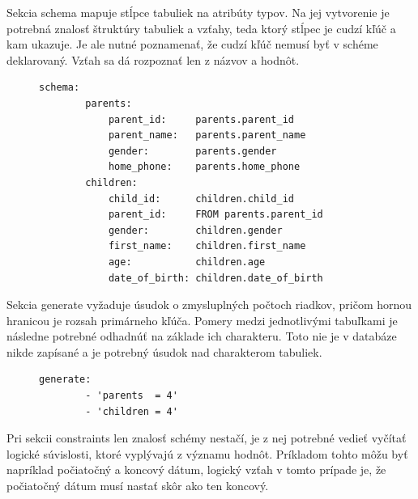 Sekcia schema mapuje stĺpce tabuliek na atribúty typov. Na jej vytvorenie je potrebná znalosť štruktúry tabuliek a vzťahy, teda ktorý stĺpec je cudzí kľúč a kam ukazuje. Je ale nutné poznamenať, že cudzí kľúč nemusí byť v schéme deklarovaný. Vzťah sa dá rozpoznať len z názvov a hodnôt. 


\begin{figure}[H]
    \centering
    \begin{lstlisting}[caption={Schema sekcia pre ukážkovú databázu.}, frame=single, linewidth=0.85\textwidth, xleftmargin=0.165\textwidth, label={lst:recipe-schema}]
    schema:
        parents:
            parent_id:     parents.parent_id
            parent_name:   parents.parent_name
            gender:        parents.gender
            home_phone:    parents.home_phone
        children:
            child_id:      children.child_id
            parent_id:     FROM parents.parent_id
            gender:        children.gender
            first_name:    children.first_name
            age:           children.age
            date_of_birth: children.date_of_birth
    \end{lstlisting}

\end{figure}

Sekcia generate vyžaduje úsudok o zmysluplných počtoch riadkov, pričom hornou hranicou je rozsah primárneho kľúča. Pomery medzi jednotlivými tabuľkami je následne potrebné odhadnúť na základe ich charakteru. Toto nie je v databáze nikde zapísané a je potrebný úsudok nad charakterom tabuliek.



\begin{figure}[H]
    \centering
    \begin{lstlisting}[caption={Generate sekcia pre ukážkovú databázu.}, frame=single, linewidth=0.75\textwidth, xleftmargin=0.260\textwidth, label={lst:recipe-generate}]
    generate:
        - 'parents  = 4'
        - 'children = 4'
    \end{lstlisting}

\end{figure}

Pri sekcii constraints len znalosť schémy nestačí, je z nej potrebné vedieť vyčítať logické súvislosti, ktoré vyplývajú z významu hodnôt. Príkladom tohto môžu byť napríklad počiatočný a koncový dátum, logický vzťah v tomto prípade je, že počiatočný dátum musí nastať skôr ako ten koncový.



